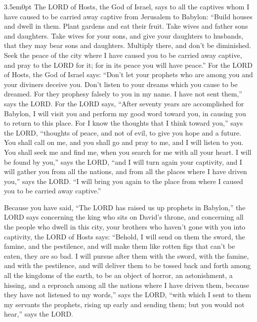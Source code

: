 \begin{adjustwidth}{3.5em}{0pt}
 \myverse{}The LORD of Hosts, the God of Israel, says to all the captives whom I have caused to be carried away captive from Jerusalem to Babylon: \myverse{}“Build houses and dwell in them. Plant gardens and eat their fruit. \myverse{}Take wives and father sons and daughters. Take wives for your sons, and give your daughters to husbands, that they may bear sons and daughters. Multiply there, and don’t be diminished. \myverse{}Seek the peace of the city where I have caused you to be carried away captive, and pray to the LORD for it; for in its peace you will have peace.”	\myverse{}For the LORD of Hosts, the God of Israel says: “Don’t let your prophets who are among you and your diviners deceive you. Don’t listen to your dreams which you cause to be dreamed. \myverse{}For they prophesy falsely to you in my name. I have not sent them,” says the	LORD. \myverse{}For the LORD says, “After seventy years are accomplished for Babylon, I will visit you and perform my good word toward you, in causing you to return to this place. \myverse{}For I know the thoughts that I think toward you,” says the LORD, “thoughts of peace, and not of evil, to give you hope and a future. \myverse{}You shall call on me, and you shall go and pray to me, and I will listen	to you. \myverse{}You shall seek me and find me, when you search for me with all your heart. \myverse{}I will be found by you,” says the LORD, “and I will turn again your captivity, and I will gather you from all the nations, and from all the places where I have driven you,” says the	LORD. “I will bring you again to the place from where I caused you to be carried away captive.”
	
\myverse{}Because you have said, “The LORD has raised us up prophets in Babylon,”		 \myverse{}the LORD says concerning the king who sits on David’s throne, and concerning all the people who dwell in this city, your brothers who haven’t gone with you into captivity, \myverse{}the LORD of Hosts says: “Behold, I will send on them the sword, the famine, and the pestilence, and will make them like rotten figs that can’t be eaten, they are so bad. \myverse{}I will pursue after them with the sword, with the famine, and with the pestilence, and will deliver them to be tossed back and forth among all the kingdoms of the earth, to be an object of horror, an astonishment, a hissing, and a reproach among all the nations where I have driven them, \myverse{}because they have not listened to my words,” says the LORD, “with which I sent to them my servants the prophets, rising up early and sending them; but you would not hear,” says the LORD.
		

\end{adjustwidth}
